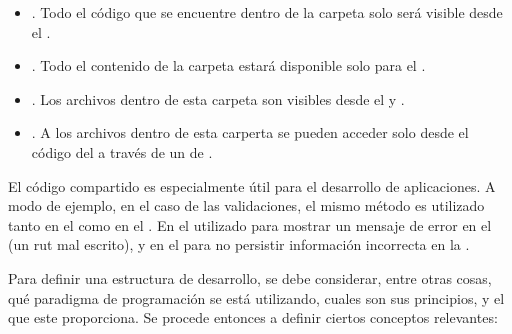 	\begin{itemize}
		\item
			\textbf{\clientFolder}. Todo el código que se encuentre dentro de la carpeta  \clientFolder solo será visible desde el \clientSideAS.
		\item
			\textbf{\serverFolder}.  Todo el contenido de la carpeta \serverFolder estará disponible solo para el \serverSideAS.
		\item
			\textbf{\publicFolder}. Los archivos dentro de esta carpeta son visibles desde el \clientSideAS y \serverSideAS.
		\item
			\textbf{\privateFolder}. A los archivos dentro de esta carperta se pueden acceder solo desde el código del \serverAS a través de un \apiAS de \assetsAS.
	\end{itemize}



El código compartido es especialmente útil para el desarrollo de aplicaciones. A modo de ejemplo, en el caso de las validaciones, el mismo método es utilizado tanto en el \clientSideAS como en el \serverSideAS. En el \clientSideAS utilizado para mostrar un mensaje de error en el \browserINT (un rut mal escrito), y en el \serverSideAS para no persistir información incorrecta en la \dataBasesDB.

Para definir una estructura de desarrollo, se debe considerar, entre otras cosas, qué paradigma de programación se está utilizando, cuales son sus principios, y el \apiAS que este proporciona. Se procede entonces a definir ciertos conceptos relevantes:

